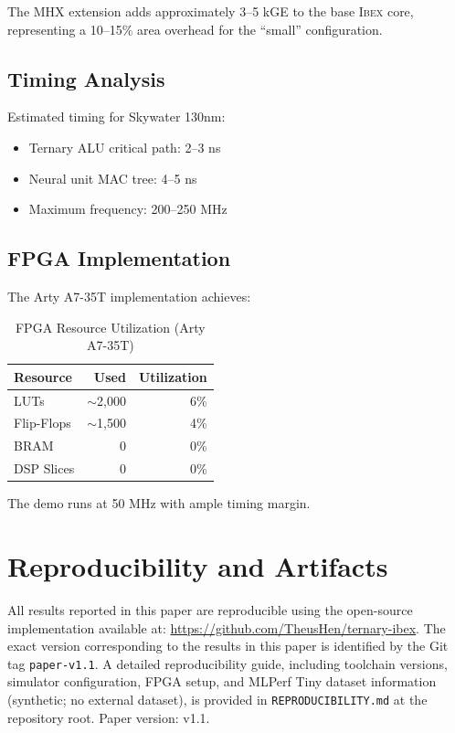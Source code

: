 \documentclass[conference,10pt]{IEEEtran}
\newcommand{\mhx}{\textsc{MHX\texttrademark}}
\newcommand{\ibex}{\textsc{Ibex}}
\begin{document}
The \mhx{} extension adds approximately 3--5 kGE to the base \ibex{} core, representing a 10--15\% area overhead for the ``small'' configuration.

\subsection{Timing Analysis}

Estimated timing for Skywater 130nm:

\begin{itemize}
    \item Ternary ALU critical path: 2--3 ns
    \item Neural unit MAC tree: 4--5 ns
    \item Maximum frequency: 200--250 MHz
\end{itemize}

\subsection{FPGA Implementation}

The Arty A7-35T implementation achieves:

\begin{table}[h]
\centering
\caption{FPGA Resource Utilization (Arty A7-35T)}
\label{tab:fpga}
\begin{tabular}{|l|r|r|}
\hline
\textbf{Resource} & \textbf{Used} & \textbf{Utilization} \\
\hline
LUTs & $\sim$2,000 & 6\% \\
Flip-Flops & $\sim$1,500 & 4\% \\
BRAM & 0 & 0\% \\
DSP Slices & 0 & 0\% \\
\hline
\end{tabular}
\end{table}

The demo runs at 50 MHz with ample timing margin.

\section{Reproducibility and Artifacts}
\label{sec:reproducibility}

All results reported in this paper are reproducible using the open-source implementation available at: \url{https://github.com/TheusHen/ternary-ibex}. The exact version corresponding to the results in this paper is identified by the Git tag \texttt{paper-v1.1}. A detailed reproducibility guide, including toolchain versions, simulator configuration, FPGA setup, and MLPerf Tiny dataset information (synthetic; no external dataset), is provided in \texttt{REPRODUCIBILITY.md} at the repository root. Paper version: v1.1.
\end{document}
